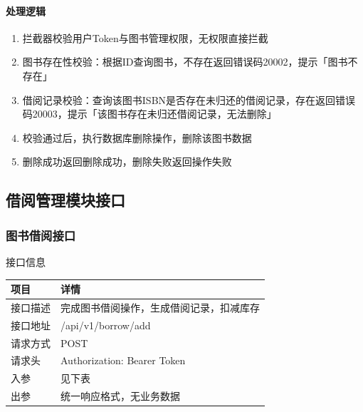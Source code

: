 \documentclass[12pt, a4paper]{article}
\begin{document}
\paragraph{处理逻辑}
\begin{enumerate}
\item 拦截器校验用户Token与图书管理权限，无权限直接拦截

\item 图书存在性校验：根据ID查询图书，不存在返回错误码20002，提示「图书不存在」

\item 借阅记录校验：查询该图书ISBN是否存在未归还的借阅记录，存在返回错误码20003，提示「该图书存在未归还借阅记录，无法删除」

\item 校验通过后，执行数据库删除操作，删除该图书数据

\item 删除成功返回删除成功，删除失败返回操作失败
\end{enumerate}

\newpage
\subsection{借阅管理模块接口}

\subsubsection{图书借阅接口}
\begin{center}
    接口信息
\end{center}

\begin{table}[H]
    \centering
    \begin{tabular}{|l|l|}
        \hline
        项目 & 详情 \\
        \hline
        接口描述 & 完成图书借阅操作，生成借阅记录，扣减库存 \\
        \hline
        接口地址 & /api/v1/borrow/add \\
        \hline
        请求方式 & POST \\
        \hline
        请求头 & Authorization: Bearer {Token} \\
        \hline
        入参 & 见下表 \\
        \hline
        出参 & 统一响应格式，无业务数据 \\
        \hline
    \end{tabular}
\end{table}
\end{document}
